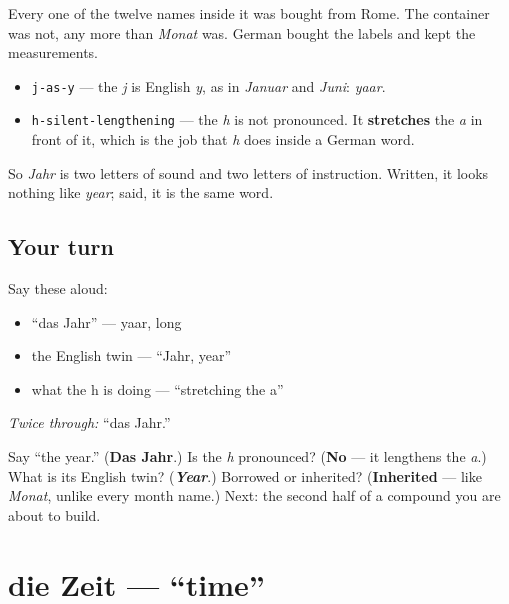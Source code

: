 Every one of the twelve names inside it was bought from Rome. The container was not, any more than \emph{Monat} was. German bought the labels and kept the measurements.

\begin{sounds}
\begin{itemize}
\raggedright
  \item \texttt{j-as-y} — the \emph{j} is English \emph{y}, as in \emph{Januar} and \emph{Juni}: \emph{yaar}.
  \item \texttt{h-silent-lengthening} — the \emph{h} is not pronounced. It \textbf{stretches} the \emph{a} in front of it, which is the job that \emph{h} does inside a German word.
\end{itemize}

So \emph{Jahr} is two letters of sound and two letters of instruction. Written, it looks nothing like \emph{year}; said, it is the same word.
\end{sounds}

\subsection*{Your turn}
Say these aloud:

\begin{itemize}
\raggedright
  \item \textquotedblleft{}das Jahr\textquotedblright{} — yaar, long
  \item the English twin — \textquotedblleft{}Jahr, year\textquotedblright{}
  \item what the h is doing — \textquotedblleft{}stretching the a\textquotedblright{}
\end{itemize}

\emph{Twice through:} \textquotedblleft{}das Jahr.\textquotedblright{}

\begin{tcolorbox}[breakable,colback=teal!4,colframe=teal!35!black,title={Before you move on}]
Say \textquotedblleft{}the year.\textquotedblright{} (\textbf{Das Jahr}.) Is the \emph{h} pronounced? (\textbf{No} — it lengthens the \emph{a}.) What is its English twin? (\emph{\textbf{Year}}.) Borrowed or inherited? (\textbf{Inherited} — like \emph{Monat}, unlike every month name.) Next: the second half of a compound you are about to build.
\end{tcolorbox}
\section[die Zeit]{die Zeit — \textquotedblleft{}time\textquotedblright{}}

